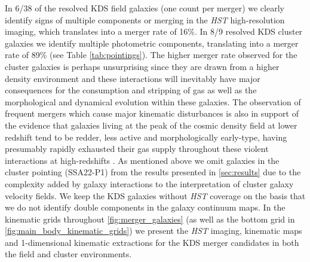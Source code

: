 \documentclass[fleqn,usenatbib]{mn2e}
\begin{document}
In 6/38 of the resolved KDS field galaxies (one count per merger) we clearly identify signs of multiple components or merging in the {\em HST} high-resolution imaging, which translates into a merger rate of 16\%.
In 8/9 resolved KDS cluster galaxies we identify multiple photometric components, translating into a merger rate of 89\%  (see Table \ref{tab:pointings}).
The higher merger rate observed for the cluster galaxies is perhaps unsurprising since they are drawn from a higher density environment and these interactions will inevitably have major consequences for the consumption and stripping of gas as well as the morphological and dynamical evolution within these galaxies.
The observation of frequent mergers which cause major kinematic disturbances is also in support of the evidence that galaxies living at the peak of the cosmic density field at lower redshift tend to be redder, less active and morphologically early-type, having presumably rapidly exhausted their gas supply throughout these violent interactions at high-redshifts \citep[e.g.][]{Steidel1998,White2007,Kodama2007,Zheng2009}.
As mentioned above we omit galaxies in the cluster pointing (SSA22-P1) from the results presented in \cref{sec:results} due to the complexity added by galaxy interactions to the interpretation of cluster galaxy velocity fields.
We keep the KDS galaxies without {\em HST} coverage on the basis that we do not identify double components in the galaxy continuum maps. 
In the kinematic grids throughout \ref{fig:merger_galaxies} (as well as the bottom grid in \ref{fig:main_body_kinematic_grids}) we present the {\em HST} imaging, kinematic maps and 1-dimensional kinematic extractions for the KDS merger candidates in both the field and cluster environments.
\end{document}
